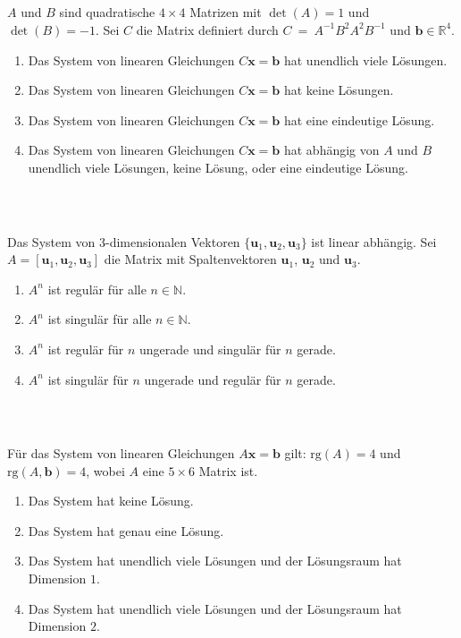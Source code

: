 \subsection*{}
$A$ und $B$ sind quadratische $4 \times 4$ Matrizen mit
$\det(A) = 1$ und $\det(B) = -1$.
Sei $C$ die Matrix definiert durch 
$C \ = \ A^{-1}B^2 A^2 B^{-1}$ und $\textbf{b} \in \mathbb{R}^4$.
\renewcommand{\labelenumi}{(\alph{enumi})}
\begin{enumerate}
\item 
Das System von linearen Gleichungen $C \textbf{x} = \textbf{b}$ hat unendlich viele Lösungen.
\item
Das System von linearen Gleichungen $C \textbf{x} = \textbf{b}$ hat keine Lösungen.
\item
Das System von linearen Gleichungen $C \textbf{x} = \textbf{b}$ hat eine eindeutige Lösung.
\item
Das System von linearen Gleichungen $C \textbf{x} = \textbf{b}$ hat abhängig von $A$ und $B$ unendlich viele Lösungen, keine Lösung, oder eine eindeutige Lösung.
\end{enumerate}
\ \\
\subsection*{}
Das System von $3$-dimensionalen Vektoren
$\lbrace \textbf{u}_1, \textbf{u}_2, \textbf{u}_3 \rbrace$
ist linear abhängig.
Sei $A = [\textbf{u}_1, \textbf{u}_2, \textbf{u}_3]$ die Matrix mit Spaltenvektoren $\textbf{u}_1$, $\textbf{u}_2$ und $\textbf{u}_3$. 
\renewcommand{\labelenumi}{(\alph{enumi})}
\begin{enumerate}
\item 
$A^n$ ist regulär für alle $n \in \mathbb{N}$.
\item
$A^n$ ist singulär für alle $n \in \mathbb{N}$.
\item
$A^n$ ist regulär für $n$ ungerade und singulär für $n$ gerade.
\item
$A^n$ ist singulär für $n$ ungerade und regulär für $n$ gerade.
\end{enumerate}
\ \\
\subsection*{}
Für das System von linearen Gleichungen $A \textbf{x} = \textbf{b}$ gilt:
$\text{rg}(A) = 4$ und $\text{rg}(A,\textbf{b}) = 4$, wobei $A$ eine $5 \times 6$ Matrix ist.
\renewcommand{\labelenumi}{(\alph{enumi})}
\begin{enumerate}
\item 
Das System hat keine Lösung.
\item
Das System hat genau eine Lösung.
\item
Das System hat unendlich viele Lösungen und der Lösungsraum hat Dimension $1$.
\item
Das System hat unendlich viele Lösungen und der Lösungsraum hat Dimension $2$.
\end{enumerate}
\ \\

